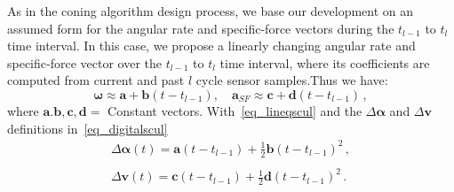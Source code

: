 \documentclass[journal]{IEEEtran}
\begin{document}
As in the coning algorithm design process, we base our development on an assumed form for the angular rate and specific-force vectors during the  $t_{l-1}$ to $t_l$ time interval. In this case, we propose a linearly changing angular rate and specific-force vector over the $t_{l-1}$ to $t_l$ time interval, where its coefficients are computed from current and past $l$ cycle sensor samples.Thus we have:
\begin{equation}\label{eq_lineqscul}
    \boldsymbol{\omega}\approx\boldsymbol{a}+\boldsymbol{b}(t-t_{l-1}), \quad  \boldsymbol{a}_{SF}\approx\boldsymbol{c}+ \boldsymbol{d}(t-t_{l-1})\,,
\end{equation}
where $\boldsymbol{a}.\boldsymbol{b},\boldsymbol{c},\boldsymbol{d} = $ Constant vectors.
With~\eqref{eq_lineqscul} and the $\Delta\boldsymbol{\alpha}$ and $\Delta\boldsymbol{v}$ definitions in~\eqref{eq_digitalscul}
\begin{equation}\label{eq_lineqscul2}
\begin{array}{c}
  \Delta\boldsymbol{\alpha}(t) = \boldsymbol{a}(t-t_{l-1}) +\frac{1}{2}\boldsymbol{b}(t-t_{l-1})^2\,, \\
  \\
\Delta\boldsymbol{v}(t) = \boldsymbol{c}(t-t_{l-1}) +\frac{1}{2}\boldsymbol{d}(t-t_{l-1})^2\,. \\
\end{array}
\end{equation}
\end{document}
